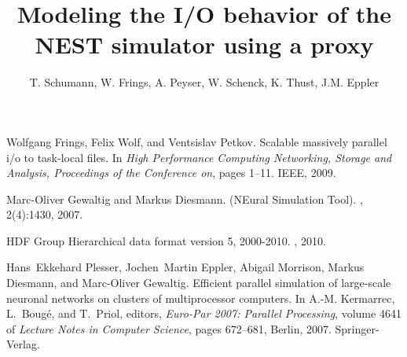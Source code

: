 \documentclass[]{AbstractYIC2015}
\title{Modeling the I/O behavior of the NEST simulator using a proxy}
\author[T. Schumann et al.]{%
  T. Schumann\authref{a}\corref,
  W. Frings\authref{b},
  A. Peyser\authref{c},
  W. Schenck\authref{c},
  K. Thust\authref{b},
  J.M. Eppler\authref{c}
}
\begin{document}
\maketitle



\begin{thebibliography}{99}

Wolfgang Frings, Felix Wolf, and Ventsislav Petkov.
\newblock Scalable massively parallel i/o to task-local files.
\newblock In {\em High Performance Computing Networking, Storage and Analysis,
  Proceedings of the Conference on}, pages 1--11. IEEE, 2009.

Marc-Oliver Gewaltig and Markus Diesmann.
 ({NE}ural {S}imulation {T}ool).
, 2(4):1430, 2007.

HDF Group 
\newblock Hierarchical data format version 5, 2000-2010.
, 2010.

Hans~Ekkehard Plesser, Jochen~Martin Eppler, Abigail Morrison, Markus Diesmann,
  and Marc-Oliver Gewaltig.
\newblock Efficient parallel simulation of large-scale neuronal networks on
  clusters of multiprocessor computers.
\newblock In A.-M. Kermarrec, L.~Boug{\'e}, and T.~Priol, editors, {\em
  Euro-Par 2007: Parallel Processing}, volume 4641 of {\em Lecture Notes in
  Computer Science}, pages 672--681, Berlin, 2007. Springer-Verlag.

\end{thebibliography}
\end{document}
